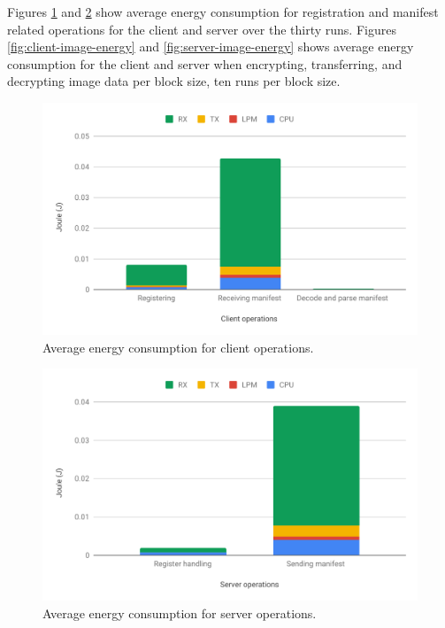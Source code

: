 \documentclass[0-thesis.tex]{subfiles}
\begin{document}
Figures \ref{fig:client-operations-energy} and \ref{fig:server-operations-energy} show
average energy consumption for registration and manifest related operations for the
client and server over the thirty runs. Figures \ref{fig:client-image-energy} and
\ref{fig:server-image-energy} shows average energy consumption for the client and server
when encrypting, transferring, and decrypting image data per block size, ten runs per
block size. 

\begin{figure}[h!]
    \caption{Average energy consumption for client operations.}
    \label{fig:client-operations-energy}
    \includegraphics[scale=0.65]{images/client-operations-energy.pdf}
\end{figure}

\begin{figure}[h!]
    \caption{Average energy consumption for server operations.}
    \label{fig:server-operations-energy}
    \includegraphics[scale=0.65]{images/server-operations-energy.pdf}
\end{figure}
\end{document}
